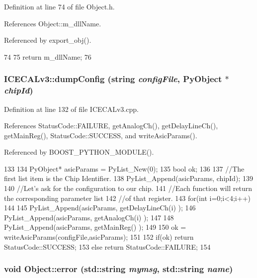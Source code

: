 Definition at line 74 of file Object.h.

References Object::m\_\-dllName.

Referenced by export\_\-obj().


\begin{DoxyCode}
74                        {
75     return m_dllName;
76   }  
\end{DoxyCode}
\hypertarget{classICECALv3_ac26be912fb72e615106fceb4626aa548}{
\subsubsection[{dumpConfig}]{ ICECALv3::dumpConfig (string {\em configFile}, \/  PyObject $\ast$ {\em chipId})}}
\label{classICECALv3_ac26be912fb72e615106fceb4626aa548}


Definition at line 132 of file ICECALv3.cpp.

References StatusCode::FAILURE, getAnalogCh(), getDelayLineCh(), getMainReg(), StatusCode::SUCCESS, and writeAsicParams().

Referenced by BOOST\_\-PYTHON\_\-MODULE().


\begin{DoxyCode}
133 {
134     PyObject* asicParams = PyList_New(0);
135     bool ok;
136 
137     //The first list item is the Chip Identifier.
138     PyList_Append(asicParams, chipId);
139 
140     //Let's ask for the configuration to our chip.
141     //Each function will return the corresponding parameter list
142     //of that register.
143     for(int i=0;i<4;i++)
144     {
145         PyList_Append(asicParams, getDelayLineCh(i) );
146         PyList_Append(asicParams, getAnalogCh(i) );
147     }
148     PyList_Append(asicParams, getMainReg() );
149 
150     ok = writeAsicParams(configFile,asicParams);
151 
152     if(ok) return StatusCode::SUCCESS;
153     else   return StatusCode::FAILURE;
154 }
\end{DoxyCode}
\hypertarget{classObject_ad7f6c457733082efa2f9ff5f5c8e119a}{
\subsubsection[{error}]{\setlength{\rightskip}{0pt plus 5cm}void Object::error (std::string {\em mymsg}, \/  std::string {\em name})}}
\label{classObject_ad7f6c457733082efa2f9ff5f5c8e119a}


